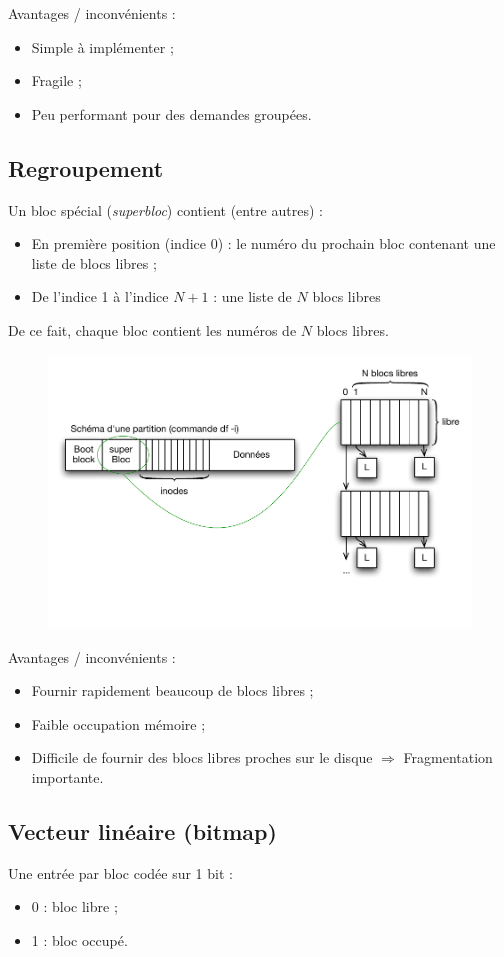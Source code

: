\documentclass[11pt,english,french]{scrreprt}
\theoremstyle{remark}
\theoremstyle{definition}
\newcommand*\Pitem{%
  \item[\color{green}\scalebox{0.9}{\textbullet}]}
\newcommand*\Citem{%
  \item[\color{red}\scalebox{0.9}{\textbullet}]}
\begin{document}
Avantages / inconvénients :
\begin{itemize}
	\Pitem Simple à implémenter ;
	\Citem Fragile ;
	\Citem Peu performant pour des demandes groupées.
\end{itemize}

\subsection{Regroupement}
Un bloc spécial (\emph{superbloc}) contient (entre autres) :\begin{itemize}
	\item En première position (indice 0) : le numéro du prochain bloc contenant une liste de blocs libres ;
	\item De l'indice 1 à l'indice $N+1$ : une liste de $N$ blocs libres
\end{itemize}
De ce fait, chaque bloc contient les numéros de $N$ blocs libres.
\begin{figure}[h!]
	\center
	\vspace{-25pt}
	\includegraphics[scale=.85]{img/regroupement}
	\vspace{-50pt}
\end{figure}

Avantages / inconvénients :
\begin{itemize}
	\Pitem Fournir rapidement beaucoup de blocs libres ;
	\Pitem Faible occupation mémoire ;
	\Citem Difficile de fournir des blocs libres proches sur le disque $\Rightarrow$ Fragmentation importante.
\end{itemize}

\subsection{Vecteur linéaire (bitmap)}
Une entrée par bloc codée sur 1 bit :
\begin{itemize}
	\item 0 : bloc libre ;
	\item 1 : bloc occupé.
\end{itemize}
\end{document}
